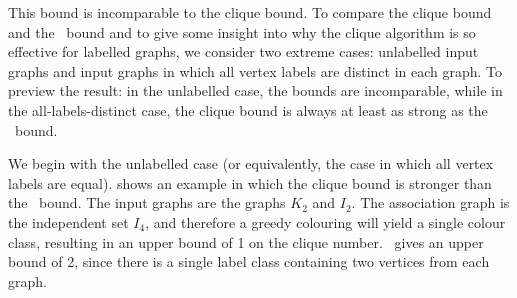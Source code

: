 
%

This bound is incomparable to the clique bound.
To compare the clique bound and the \McSplit\ bound and to give some
insight into why the clique algorithm is so effective for labelled
graphs, we consider two extreme
cases: unlabelled input graphs and input graphs in which all vertex labels are
distinct in each graph.  To preview the result: in the unlabelled case,
the bounds are incomparable, while in the all-labels-distinct case,
the clique bound is always at least as strong as the \McSplit\ bound.

We begin with the unlabelled case (or equivalently, the case in which
all vertex labels are equal).   shows
an example in which the clique bound is stronger than the \McSplit\ bound.
The input graphs are the graphs $K_2$ and $I_2$.  The association graph
is the independent set $I_4$, and therefore a greedy colouring will yield
a single colour class, resulting in an upper bound of 1 on the clique
number.  \McSplit\ gives an upper bound of 2, since there is a single label
class containing two vertices from each graph.

